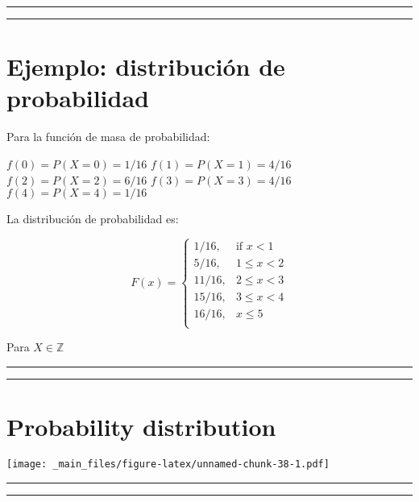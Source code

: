 \documentclass[
]{book}
\begin{document}
\begin{center}\rule{0.5\linewidth}{0.5pt}\end{center}

\begin{center}\rule{0.5\linewidth}{0.5pt}\end{center}

\hypertarget{ejemplo-distribuciuxf3n-de-probabilidad}{%
\section{Ejemplo: distribución de probabilidad}\label{ejemplo-distribuciuxf3n-de-probabilidad}}

Para la función de masa de probabilidad:

\(f(0)=P(X=0)=1/16\)
\(f(1)=P(X=1)=4/16\)
\(f(2)=P(X=2)=6/16\)
\(f(3)=P(X=3)=4/16\)
\(f(4)=P(X=4)=1/16\)

La distribución de probabilidad es:

\[
    F(x)=
\begin{cases}
    1/16,& \text{if } x < 1\\
    5/16,& 1\leq x < 2\\
    11/16,& 2\leq x < 3\\
    15/16,& 3\leq x < 4\\
    16/16,&  x \leq 5\\
\end{cases}
\]

Para \(X \in \mathbb{Z}\)

\begin{center}\rule{0.5\linewidth}{0.5pt}\end{center}

\begin{center}\rule{0.5\linewidth}{0.5pt}\end{center}

\hypertarget{probability-distribution}{%
\section{Probability distribution}\label{probability-distribution}}

\texttt{[image: \_main\_files/figure-latex/unnamed-chunk-38-1.pdf]}

\begin{center}\rule{0.5\linewidth}{0.5pt}\end{center}

\begin{center}\rule{0.5\linewidth}{0.5pt}\end{center}
\end{document}
